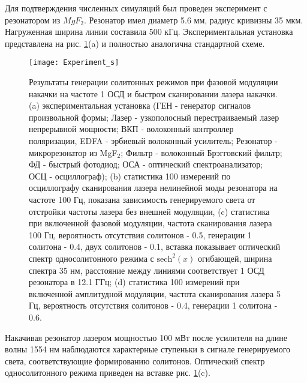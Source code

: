 
Для подтверждения численных симуляций был проведен эксперимент с резонатором из $MgF_2$. Резонатор имел диаметр 5.6 мм, радиус кривизны 35 мкм. Нагруженная ширина линии составила 500 кГц. Экспериментальная установка представлена на рис. \ref{chaos_order_experiment}(a) и полностью аналогична стандартной схеме.

\begin{figure}[ht]
\centering
  \texttt{[image: Experiment\_s]}
  \caption{Результаты генерации солитонных режимов при фазовой модуляции накачки на частоте 1 ОСД и быстром сканировании лазера накачки. (a) экспериментальная установка (ГЕН - генератор сигналов произвольной формы; Лазер - узкополосный перестраиваемый лазер непрерывной мощности; ВКП - волоконный контроллер поляризации, EDFA - эрбиевый волоконный усилитель; Резонатор -  микрорезонатор из MgF$_2$; Фильтр - волоконный Брэгговский фильтр; ФД - быстрый фотодиод; ОСА - оптический спектроанализатор; ОСЦ - осциллограф); (b) статистика 100 измерений по осциллографу сканирования лазера нелинейной моды резонатора на частоте 100 Гц, показана зависимость генерируемого света от отстройки частоты лазера без внешней модуляции, (c) статистика при включенной фазовой модуляции, частота сканирования лазера 100 Гц, вероятность отсутствия солитонов - 0.5, генерации 1 солитона - 0.4, двух солитонов - 0.1, вставка показывает оптический спектр односолитонного режима с $\text{sech}^2(x)$ огибающей, ширина спектра 35 нм, расстояние между линиями соответствует 1 ОСД резонатора в 12.1 ГГц; (d) статистика 100 измерений при включенной амплитудной модуляции, частота сканирования лазера 5 Гц, вероятность отсутствия солитонов - 0.4, генерации 1 солитона - 0.6.}
  \label{chaos_order_experiment}
\end{figure}

Накачивая резонатор лазером мощностью 100 мВт после усилителя на длине волны 1554 нм наблюдаются характерные ступеньки в сигнале генерируемого света, соответствующие формированию солитонов. Оптический спектр односолитонного режима приведен на вставке рис. \ref{chaos_order_experiment}(c).

